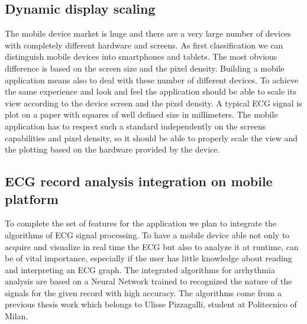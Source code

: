 \subsection{Dynamic display scaling}
The mobile device market is huge and there are a very large number of devices with completely different hardware and screens. As first classification we can distinguish mobile devices into smartphones and tablets. The most obvious difference is based on the screen size and the pixel density. Building a mobile application means also to deal with these number of different devices. To achieve the same experience and look and feel the application should be able to scale its view according to the device screen and the pixel density. A typical ECG signal is plot on a paper with squares of well defined size in millimeters. The mobile application has to respect such a standard independently on the screens capabilities and pixel density, so it should be able to properly scale the view and the plotting based on the hardware provided by the device.

\subsection{ECG record analysis integration on mobile platform}
To complete the set of features for the application we plan to integrate the algorithms of ECG signal processing. To have a mobile device able not only to acquire and visualize in real time the ECG but also to analyze it at runtime, can be of vital importance, especially if the user has little knowledge about reading and interpreting an ECG graph. The integrated algorithms for arrhythmia analysis are based on a Neural Network trained to recognized the nature of the signals for the given record with high accuracy. The algorithms come from a previous thesis work\cite{ref3} which belongs to Ulisse Pizzagalli, student at Politecnico of Milan.

